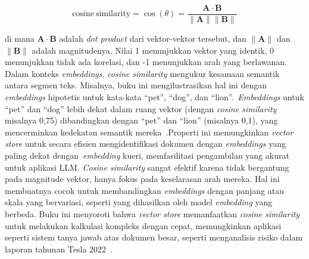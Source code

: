 \[
\mathrm{cosine\ similarity} = \cos(\theta) = \frac{\mathbf{A} \cdot \mathbf{B}}{\|\mathbf{A}\| \|\mathbf{B}\|}
\]

di mana \( \mathbf{A} \cdot \mathbf{B} \) adalah \emph{dot product} dari vektor-vektor tersebut, dan \( \|\mathbf{A}\| \) dan \( \|\mathbf{B}\| \) adalah magnitudenya. Nilai 1 menunjukkan vektor yang identik, 0 menunjukkan tidak ada korelasi, dan -1 menunjukkan arah yang berlawanan.
\singlespacing{}
Dalam konteks \emph{embeddings}, \emph{cosine similarity} mengukur kesamaan semantik antara segmen teks. Misalnya, buku ini mengilustrasikan hal ini dengan \emph{embeddings} hipotetis untuk kata-kata ``pet'', ``dog'', dan ``lion''.~\emph{Embeddings} untuk ``pet'' dan ``dog'' lebih dekat dalam ruang vektor (dengan \emph{cosine similarity} misalnya 0,75) dibandingkan dengan ``pet'' dan ``lion'' (misalnya 0,1), yang mencerminkan kedekatan semantik mereka~\cite{oshin2024learning}.\@ Properti ini memungkinkan \emph{vector store} untuk secara efisien mengidentifikasi dokumen dengan \emph{embeddings} yang paling dekat dengan~\emph{embedding} kueri, memfasilitasi pengambilan yang akurat untuk aplikasi LLM.\@
\singlespacing{}
\emph{Cosine similarity} sangat efektif karena tidak bergantung pada magnitude vektor, hanya fokus pada keselarasan arah mereka. Hal ini membuatnya cocok untuk membandingkan \emph{embeddings} dengan panjang atau skala yang bervariasi, seperti yang dihasilkan oleh model \emph{embedding} yang berbeda. Buku ini menyoroti bahwa \emph{vector store} memanfaatkan \emph{cosine similarity} untuk melakukan kalkulasi kompleks dengan cepat, memungkinkan aplikasi seperti sistem tanya jawab atas dokumen besar, seperti menganalisis risiko dalam laporan tahunan Tesla 2022~\cite{oshin2024learning}.
